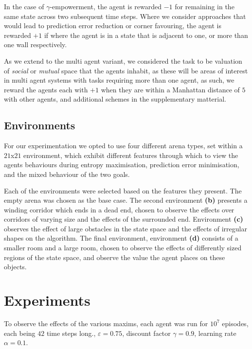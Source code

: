 \documentclass{article}
\begin{document}
In the case of $\gamma$-empowerment, the agent is rewarded $-1$ for remaining in the same state across two subsequent time steps. Where we consider approaches that would lead to prediction error reduction or corner favouring, the agent is rewarded $+1$ if where the agent is in a state that is adjacent to one, or more than one wall respectively.

As we extend to the multi agent variant, we considered the task to be valuation of \emph{social} or \emph{mutual} space that the agents inhabit, as these will be areas of interest in multi agent systems with tasks requiring more than one agent, as such, we reward the agents each with $+1$ when they are within a Manhattan distance of $5$ with other agents, and additional schemes in the supplementary matterial.

\subsection{Environments}

For our experimentation we opted to use four different arena types, set within a $21$x$21$ environment, which exhibit different features through which to view the agents behaviours during entropy maximisation, prediction error minimisation, and the mixed behaviour of the two goals.

Each of the environments were selected based on the features they present. The empty arena was chosen as the base case. The second environment \textbf{(b)} presents a winding corridor which ends in a dead end, chosen to observe the effects over corridors of varying size and the effects of the surrounded end. Environment \textbf{(c)} observes the effect of large obstacles in the state space and the effects of irregular shapes on the algorithm. The final environment, environment \textbf{(d)} consists of a smaller room and a large room, chosen to observe the effects of differently sized regions of the state space, and observe the value the agent places on these objects. 

\section{Experiments\label{Results}}

To observe the effects of the various maxims, each agent was run for $10^7$ episodes, each being $42$ time steps long., $\varepsilon=0.75$, discount factor $\gamma=0.9$, learning rate $\alpha=0.1$.
\end{document}
